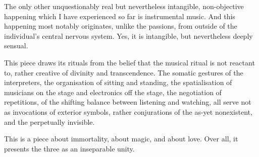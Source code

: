 \documentclass[12pt]{article}
\begin{document}
\begingroup
\hspace{4mm} The only other unquestionably real but nevertheless intangible, non-objective happening which I have experienced so far is instrumental music. And this happening most notably originates, unlike the passions, from outside of the individual's central nervous system. Yes, it is intangible, but nevertheless deeply sensual. 
\endgroup

\begingroup
\hspace{4mm} This piece draws its rituals from the belief that the musical ritual is not reactant to, rather creative of divinity and transcendence. The somatic gestures of the interpreters, the organisation of sitting and standing, the spatialisation of musicians on the stage and electronics off the stage, the negotiation of repetitions, of the shifting balance between listening and watching, all serve not as invocations of exterior symbols, rather conjurations of the as-yet nonexistent, and the perpetually invisible. 
\endgroup

\begingroup
\hspace{4mm} This is a piece about immortality, about magic, and about love. Over all, it presents the three as an inseparable unity.
\endgroup
\end{document}
